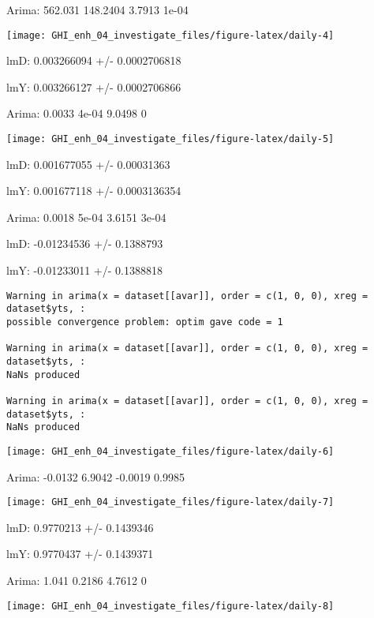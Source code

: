 \documentclass[
  10pt,
  a4paper,oneside]{article}
\begin{document}
Arima: 562.031 148.2404 3.7913 1e-04

\begin{center}\texttt{[image: GHI\_enh\_04\_investigate\_files/figure-latex/daily-4]} \end{center}

lmD: 0.003266094 +/- 0.0002706818

lmY: 0.003266127 +/- 0.0002706866

Arima: 0.0033 4e-04 9.0498 0

\begin{center}\texttt{[image: GHI\_enh\_04\_investigate\_files/figure-latex/daily-5]} \end{center}

lmD: 0.001677055 +/- 0.00031363

lmY: 0.001677118 +/- 0.0003136354

Arima: 0.0018 5e-04 3.6151 3e-04

lmD: -0.01234536 +/- 0.1388793

lmY: -0.01233011 +/- 0.1388818

\begin{verbatim}
Warning in arima(x = dataset[[avar]], order = c(1, 0, 0), xreg = dataset$yts, :
possible convergence problem: optim gave code = 1

Warning in arima(x = dataset[[avar]], order = c(1, 0, 0), xreg = dataset$yts, :
NaNs produced

Warning in arima(x = dataset[[avar]], order = c(1, 0, 0), xreg = dataset$yts, :
NaNs produced
\end{verbatim}

\begin{center}\texttt{[image: GHI\_enh\_04\_investigate\_files/figure-latex/daily-6]} \end{center}

Arima: -0.0132 6.9042 -0.0019 0.9985

\begin{center}\texttt{[image: GHI\_enh\_04\_investigate\_files/figure-latex/daily-7]} \end{center}

lmD: 0.9770213 +/- 0.1439346

lmY: 0.9770437 +/- 0.1439371

Arima: 1.041 0.2186 4.7612 0

\begin{center}\texttt{[image: GHI\_enh\_04\_investigate\_files/figure-latex/daily-8]} \end{center}
\end{document}
